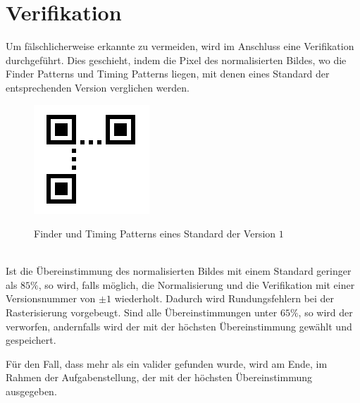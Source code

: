 \section{Verifikation}
Um fälschlicherweise erkannte \QRCodes zu vermeiden, wird im Anschluss eine Verifikation durchgeführt. Dies geschieht, indem die Pixel des normalisierten Bildes, wo die Finder Patterns und Timing Patterns liegen, mit denen eines Standard \QRCodes der entsprechenden Version verglichen werden.
\begin{figure}[h]
\centering
\includegraphics[scale=0.5]{images/verifikation.png}
\label{fig:version-qrcode}\caption{Finder und Timing Patterns eines Standard \QRCodes der Version $1$}
\end{figure}
\\
Ist die Übereinstimmung des normalisierten Bildes mit einem Standard \QRCode geringer als $85\%$, so wird, falls möglich, die Normalisierung und die Verifikation mit einer Versionsnummer von $\pm 1$ wiederholt. Dadurch wird Rundungsfehlern bei der Rasterisierung vorgebeugt. Sind alle Übereinstimmungen unter $65\%$, so wird der \QRCode verworfen, andernfalls wird der \QRCode mit der höchsten Übereinstimmung gewählt und gespeichert.

Für den Fall, dass mehr als ein valider \QRCode gefunden wurde, wird am Ende, im Rahmen der Aufgabenstellung, der \QRCode mit der höchsten Übereinstimmung ausgegeben.